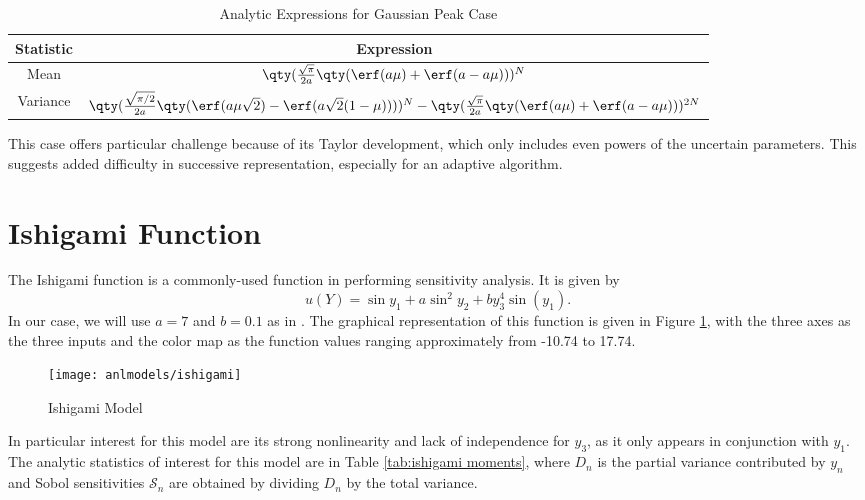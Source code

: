 \begin{table}[H]
  \centering
  \begin{tabular}{c|c}
    Statistic & Expression \\ \hline
    Mean & $\qty(\frac{\sqrt{\pi}}{2a}\qty(\erf(a\mu)+\erf(a-a\mu)))^N$ \\
    Variance & $\qty(\frac{\sqrt{\pi/2}}{2a}\qty(\erf(a\mu\sqrt{2})-\erf(a\sqrt{2}(1-\mu))))^N - \qty(\frac{\sqrt{\pi}}{2a}\qty(\erf(a\mu)+\erf(a-a\mu)))^{2N}$
  \end{tabular}
  \caption{Analytic Expressions for Gaussian Peak Case}
  \label{tab:gausspeak moments}
\end{table}
This case offers particular challenge because of its Taylor development, which only includes even powers of
the uncertain parameters.  This suggests added difficulty in successive representation, especially for an
adaptive algorithm.


\section{Ishigami Function}\label{mod:ishigami}
The Ishigami function \cite{ishigami} is a commonly-used function in performing sensitivity analysis.  It is
given by
\begin{equation}
  u(Y) = \sin{y_1} + a\sin^2{y_2} + b y_3^4\sin(y_1).
\end{equation}
In our case, we will use $a=7$ and $b=0.1$ as in \cite{ishigami2}. 
The graphical representation of this function is given in Figure \ref{fig: ishigami}, with the three axes
as the three inputs and the color map as the function values ranging approximately from -10.74 to 17.74.
\begin{figure}[htb]
  \centering
  \texttt{[image: anlmodels/ishigami]}
  \caption{Ishigami Model}
  \label{fig: ishigami}
\end{figure}
In particular interest for this model are
its strong nonlinearity and lack of independence for $y_3$, as it only appears in conjunction with $y_1$.  The
analytic statistics of interest for this model are in Table \ref{tab:ishigami moments}, where $D_n$ is the
partial variance contributed by $y_n$ and Sobol sensitivities $\mathcal{S}_n$ are obtained by dividing $D_n$
by the total variance.

